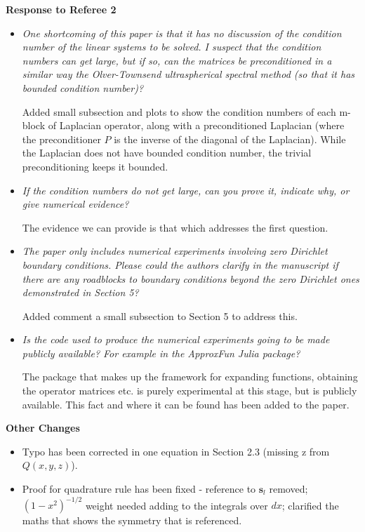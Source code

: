 \documentclass[10pt]{letter}
\newcommand{\comment}[1]{\textit{\color{bluey}#1}}
\begin{document}
\bigskip 

\centerline{\textbf{Response to Referee 2}}

\begin{itemize}[parsep=1em,leftmargin=1em]

\item \comment{One shortcoming of this paper is that it has no discussion of the condition number of the linear systems to be solved. I suspect that the condition numbers can get large, but if so, can the matrices be preconditioned in a similar way the Olver-Townsend ultraspherical spectral method (so that it has bounded condition number)?}

Added small subsection and plots to show the condition numbers of each m-block of Laplacian operator, along with a preconditioned Laplacian (where the preconditioner $P$ is the inverse of the diagonal of the Laplacian). While the Laplacian does not have bounded condition number, the trivial preconditioning keeps it bounded. 


\item \comment{If the condition numbers do not get large, can you prove it, indicate why, or give numerical evidence?}

The evidence we can provide is that which addresses the first question.


\item \comment{The paper only includes numerical experiments involving zero Dirichlet boundary conditions. Please could the authors clarify in the manuscript if there are any roadblocks to boundary conditions beyond the zero Dirichlet ones demonstrated in Section 5?}

Added comment a small subsection to Section 5 to address this. 


\item \comment{Is the code used to produce the numerical experiments going to be made publicly available? For example in the ApproxFun Julia package?}

The package that makes up the framework for expanding functions, obtaining the operator matrices etc. is purely experimental at this stage, but is publicly available. This fact and where it can be found has been added to the paper.


\end{itemize}


\bigskip

\centerline{\textbf{Other Changes}}

\begin{itemize}[parsep=1em,leftmargin=1em]
	\item Typo has been corrected in one equation in Section 2.3 (missing z from $Q(x,y,z)$).
	\item Proof for quadrature rule has been fixed - reference to $\bm{s}_l$ removed; $(1-x^2)^{-1/2}$ weight needed adding to the integrals over $dx$; clarified the maths that shows the symmetry that is referenced.
\end{itemize}
\end{document}
